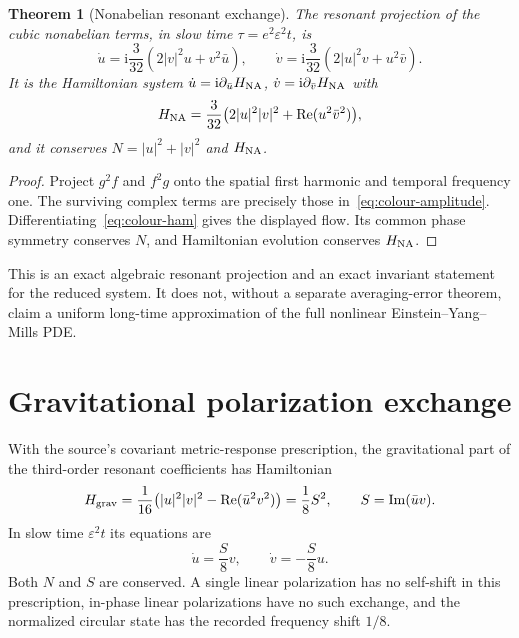 \documentclass[11pt,a4paper,oneside]{book}
\theoremstyle{plain}
\newtheorem{theorem}{Theorem}[chapter]
\theoremstyle{definition}
\theoremstyle{remark}
\newcommand{\ii}{\mathrm i}
\newcommand{\src}[2]{\cite{#1}}
\begin{document}
\begin{theorem}[Nonabelian resonant exchange]
\label{thm:colour-amplitude}
The resonant projection of the cubic nonabelian terms, in slow time $\tau=e^2\varepsilon^2t$, is
\begin{equation}
 \dot u=\ii\frac3{32}(2|v|^2u+v^2\bar u),\qquad
 \dot v=\ii\frac3{32}(2|u|^2v+u^2\bar v).
 \label{eq:colour-amplitude}
\end{equation}
It is the Hamiltonian system $\dot u=\ii\partial_{\bar u}H_{\rm NA}$, $\dot v=\ii\partial_{\bar v}H_{\rm NA}$ with
\begin{equation}
 H_{\rm NA}=\frac3{32}\bigl(2|u|^2|v|^2+
          \operatorname{Re}(u^2\bar v^2)\bigr),
 \label{eq:colour-ham}
\end{equation}
and it conserves $N=|u|^2+|v|^2$ and $H_{\rm NA}$.
\end{theorem}
\begin{proof}
Project $g^2f$ and $f^2g$ onto the spatial first harmonic and temporal frequency one. The surviving complex terms are precisely those in~\eqref{eq:colour-amplitude}. Differentiating~\eqref{eq:colour-ham} gives the displayed flow. Its common phase symmetry conserves $N$, and Hamiltonian evolution conserves $H_{\rm NA}$.
\end{proof}
\src{R20}{thm:v20v6-averaged}
This is an exact algebraic resonant projection and an exact invariant statement for the reduced system. It does not, without a separate averaging-error theorem, claim a uniform long-time approximation of the full nonlinear Einstein--Yang--Mills PDE.

\section{Gravitational polarization exchange}
With the source's covariant metric-response prescription, the gravitational part of the third-order resonant coefficients has Hamiltonian
\begin{equation}
 H_{\rm grav}=\frac1{16}\bigl(|u|^2|v|^2-
          \operatorname{Re}(\bar u^2v^2)\bigr)
 =\frac18S^2,\qquad S=\operatorname{Im}(\bar uv).
 \label{eq:grav-amplitude}
\end{equation}
In slow time $\varepsilon^2t$ its equations are
\begin{equation}
 \dot u=\frac S8v,\qquad\dot v=-\frac S8u.
 \label{eq:polarization-rotation}
\end{equation}
Both $N$ and $S$ are conserved. A single linear polarization has no self-shift in this prescription, in-phase linear polarizations have no such exchange, and the normalized circular state has the recorded frequency shift $1/8$. \src{R20}{thm:v20v8-hamiltonian}
\end{document}

